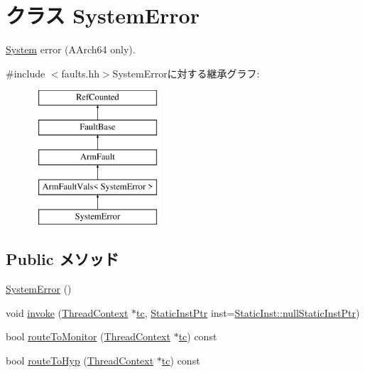 \hypertarget{classArmISA_1_1SystemError}{
\section{クラス SystemError}
\label{classArmISA_1_1SystemError}
}


\hyperlink{classSystem}{System} error (AArch64 only).  


{\ttfamily \#include $<$faults.hh$>$}SystemErrorに対する継承グラフ:\begin{figure}[H]
\begin{center}
\leavevmode
\includegraphics[height=5cm]{classArmISA_1_1SystemError}
\end{center}
\end{figure}
\subsection*{Public メソッド}
\begin{DoxyCompactItemize}
\item 
\hyperlink{classArmISA_1_1SystemError_a952c3a95357c9c6e8602a0853d8f982c}{SystemError} ()
\item 
void \hyperlink{classArmISA_1_1SystemError_a2bd783b42262278d41157d428e1f8d6f}{invoke} (\hyperlink{classThreadContext}{ThreadContext} $\ast$\hyperlink{namespaceArmISA_a5aff829af55e65b802d83dfcef4e9dd0}{tc}, \hyperlink{classRefCountingPtr}{StaticInstPtr} inst=\hyperlink{classStaticInst_aa793d9793af735f09096369fb17567b6}{StaticInst::nullStaticInstPtr})
\item 
bool \hyperlink{classArmISA_1_1SystemError_afd7a21fdb010230ad53094254739dde8}{routeToMonitor} (\hyperlink{classThreadContext}{ThreadContext} $\ast$\hyperlink{namespaceArmISA_a5aff829af55e65b802d83dfcef4e9dd0}{tc}) const 
\item 
bool \hyperlink{classArmISA_1_1SystemError_a16facd13ba8e6d15d2b865882c379d5f}{routeToHyp} (\hyperlink{classThreadContext}{ThreadContext} $\ast$\hyperlink{namespaceArmISA_a5aff829af55e65b802d83dfcef4e9dd0}{tc}) const 
\end{DoxyCompactItemize}


